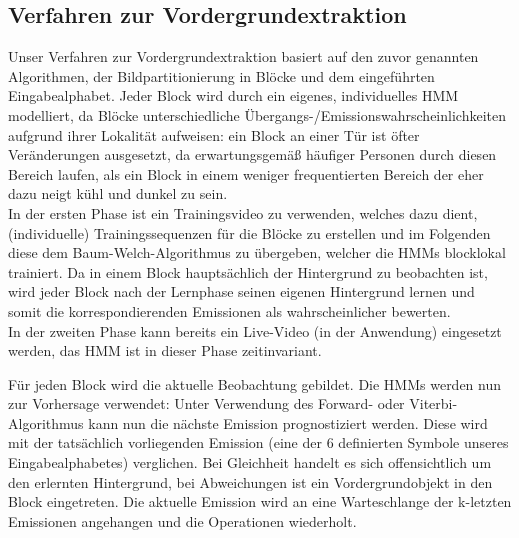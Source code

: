 \subsection{Verfahren zur Vordergrundextraktion}
\label{sec:verfahren}

Unser Verfahren zur Vordergrundextraktion basiert auf den zuvor genannten  Algorithmen, der Bildpartitionierung in Blöcke und dem eingeführten Eingabealphabet.
Jeder Block wird durch ein eigenes, individuelles HMM modelliert, da Blöcke unterschiedliche Übergangs-/Emissionswahrscheinlichkeiten aufgrund ihrer Lokalität aufweisen: ein Block an einer Tür ist öfter Veränderungen ausgesetzt, da erwartungsgemäß häufiger Personen durch diesen Bereich laufen, als ein Block in einem weniger frequentierten Bereich der eher dazu neigt kühl und dunkel zu sein.\\
In der ersten Phase ist ein Trainingsvideo zu verwenden, welches dazu dient, (individuelle) Trainingssequenzen für die Blöcke zu erstellen und im Folgenden diese dem Baum-Welch-Algorithmus zu übergeben, welcher die HMMs blocklokal trainiert.
Da in einem Block hauptsächlich der Hintergrund zu beobachten ist, wird jeder Block nach der Lernphase seinen eigenen Hintergrund lernen und somit die korrespondierenden Emissionen als wahrscheinlicher bewerten.\\
In der zweiten Phase kann bereits ein Live-Video (in der Anwendung) eingesetzt werden, das HMM ist in dieser Phase zeitinvariant.

Für jeden Block wird die aktuelle Beobachtung gebildet. Die HMMs werden nun zur Vorhersage verwendet: Unter Verwendung des Forward- oder Viterbi-Algorithmus kann nun die nächste Emission prognostiziert werden.
Diese wird mit der tatsächlich vorliegenden Emission (eine der 6 definierten Symbole unseres Eingabealphabetes) verglichen.
Bei Gleichheit handelt es sich offensichtlich um den erlernten Hintergrund, bei Abweichungen ist ein Vordergrundobjekt in den Block eingetreten.
Die aktuelle Emission wird an eine Warteschlange der k-letzten Emissionen angehangen und die Operationen wiederholt.

